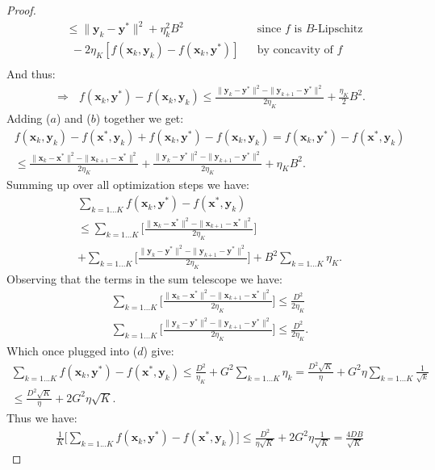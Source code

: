 \begin{proof}
\begin{align*}
        & \leq \| \bm{y}_k - \bm{y}^* \|^2 + \eta_k^2 B^2 && \text{since $f$ is $B$-Lipschitz} \\ & ~ ~ - 2  \eta_K [f(\bm{x}_k,\bm{y}_k)-f(\bm{x}_k,\bm{y}^*)] && \text{by concavity of $f$}\\
    \end{align*}
    And thus:
    \begin{align*}
        \Rightarrow ~~~ f(\bm{x}_k,\bm{y}^*) - f(\bm{x}_k,\bm{y}_k) \leq \frac{  \| \bm{y}_k - \bm{y}^* \|^2 - \| \bm{y}_{k+1}-\bm{y}^* \|^2
        }{2 \eta_K
        } + \frac{\eta_K}{2} B^2. \tag{b}
    \end{align*}
    Adding ($a$) and ($b$) together we get:
    \begin{align*}
        f(\bm{x}_k,\bm{y}_k)-f(\bm{x}^*,\bm{y}_k) + f(\bm{x}_k,\bm{y}^*) - f(\bm{x}_k,\bm{y}_k) = f(\bm{x}_k,\bm{y}^*) -f(\bm{x}^*,\bm{y}_k) \\
        \leq 
        \frac{  \| \bm{x}_k - \bm{x}^* \|^2 - \| \bm{x}_{k+1}-\bm{x}^* \|^2
        }{2 \eta_K} +
        \frac{ \| \bm{y}_k - \bm{y}^* \|^2 - \| \bm{y}_{k+1}-\bm{y}^* \|^2
        }{2 \eta_K} +
        \eta_K B^2. \tag{c}
    \end{align*}
    Summing up over all optimization steps we have:
    \begin{align*}
        \sum_{k=1...K} f(\bm{x}_k,\bm{y}^*) -f(\bm{x}^*,\bm{y}_k) \\
        \leq \sum_{k=1...K} \Bigg[
        \frac{  \| \bm{x}_k - \bm{x}^* \|^2 - \| \bm{x}_{k+1}-\bm{x}^* \|^2
        }{2 \eta_K} \Bigg] \\+ \sum_{k=1...K} \Bigg[
        \frac{ \| \bm{y}_k - \bm{y}^* \|^2 - \| \bm{y}_{k+1}-\bm{y}^* \|^2
        }{2 \eta_K}  \Bigg]  +
        B^2 \sum_{k=1...K}\eta_K. \tag{d}
    \end{align*}
    Observing that the terms in the sum telescope we have:
    \begin{align*}
        \sum_{k=1...K} \Bigg[ \frac{  \| \bm{x}_k - \bm{x}^* \|^2 - \| \bm{x}_{k+1}-\bm{x}^* \|^2
        }{2 \eta_K} \Bigg]  \leq \frac{D^2}{2 \eta_K} \\
        \sum_{k=1...K} \Bigg[
        \frac{ \| \bm{y}_k - \bm{y}^* \|^2 - \| \bm{y}_{k+1}-\bm{y}^* \|^2
        }{2 \eta_K}  \Bigg] \leq \frac{D^2}{2 \eta_K}.
    \end{align*}
    Which once plugged into ($d$) give:
    \begin{align*}
        \sum_{k=1...K} f(\bm{x}_k,\bm{y}^*) -f(\bm{x}^*,\bm{y}_k) \leq 
        \frac{D^2}{\eta_K} + G^2 \sum_{k=1...K}\eta_k = \frac{D^2 \sqrt{K}}{\eta} + G^2 \eta \sum_{k=1...K}\frac{1}{\sqrt{k}} \\
        \leq  \frac{D^2 \sqrt{K}}{\eta} +2 G^2 \eta \sqrt{K}.
    \end{align*}
    Thus we have:
    \begin{align*}
        \frac{1}{K} \Big[ \sum_{k=1...K} f(\bm{x}_k,\bm{y}^*) -f(\bm{x}^*,\bm{y}_k)  \Big] \leq \frac{D^2 }{ \eta \sqrt{K}} +  2 G^2 \eta \frac{1}{\sqrt{K}} = \frac{4DB}{\sqrt{K}}
    \end{align*}
\end{proof}

